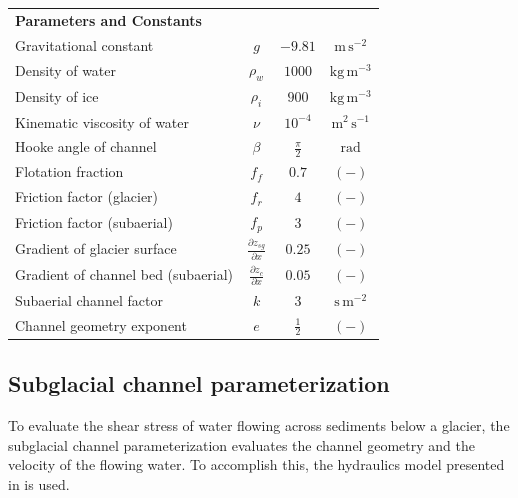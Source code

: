 \documentclass[draft]{agujournal2019}
\newcommand{\unit}[1]{$\mathrm{#1}$}
\begin{document}
\begin{table}[H]
\begin{tabular}{ l  c  c c }
      \textbf{Parameters and Constants}  & & &\\
      Gravitational constant&$g$& $-9.81$&$\mathrm{m\,s^{-2}}$\\
      Density of water & $\rho_w$& $1000$ & $\mathrm{kg\,m^{-3}}$ \\
      Density of ice & $\rho_i$& $900$ & $\mathrm{kg\,m^{-3}}$ \\
      Kinematic viscosity of water &$\nu$& $10^{-4}$& $\mathrm{m^2\,s^{-1}}$\\
      Hooke angle of channel & $\beta$ & $\frac{\pi}{2}$ & \unit{rad}\\
      Flotation fraction & $f_f$&$0.7$& $\mathrm{(-)}$\\
      Friction factor (glacier) & $f_r$ & $4$ & $\mathrm{(-)}$ \\
      Friction factor (subaerial) & $f_p$ & $3$ & $\mathrm{(-)}$\\
      Gradient of glacier surface & $\frac{\partial z_{sg}}{\partial x}$ &$0.25$& $\mathrm{(-)}$\\
      Gradient of channel bed (subaerial) &$\frac{\partial z_c}{\partial x}$ &$0.05$& $\mathrm{(-)}$\\
      Subaerial channel factor & $k$ &$3$ & $\mathrm{s\,m^{-2}}$\\
      Channel geometry exponent &$e$& $\frac{1}{2}$&$\mathrm{(-)}$ \\
      \hline
    \end{tabular}
    \label{table:vpm}
  \end{table}
  
  \subsection{Subglacial channel  parameterization}
  \label{sect:sub_mode}
  To evaluate the shear stress of water flowing across sediments below a glacier, the subglacial channel parameterization evaluates the channel geometry and the velocity of the flowing water.
  To accomplish this, the hydraulics model presented in  is used.
  
\end{document}
